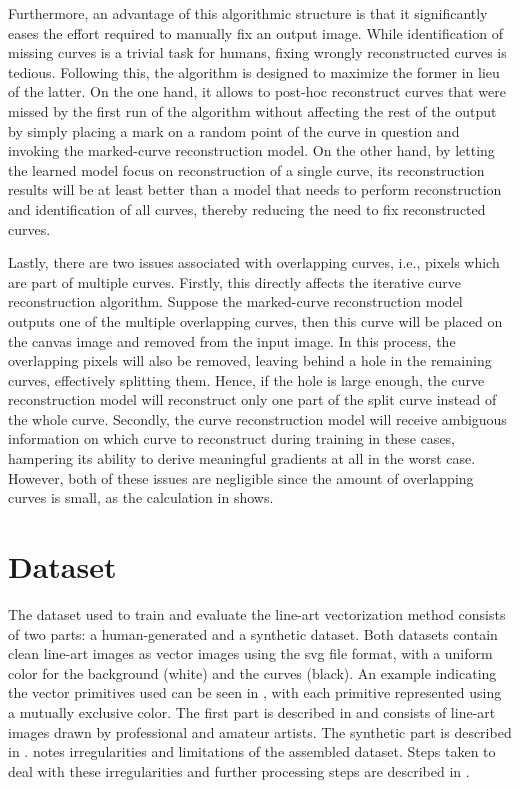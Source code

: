 Furthermore, an advantage of this algorithmic structure is that it significantly eases the effort required to manually fix an output image. While identification of missing curves is a trivial task for humans, fixing wrongly reconstructed curves is tedious. Following this, the algorithm is designed to maximize the former in lieu of the latter. On the one hand, it allows to post-hoc reconstruct curves that were missed by the first run of the algorithm without affecting the rest of the output by simply placing a mark on a random point of the curve in question and invoking the marked-curve reconstruction model. On the other hand, by letting the learned model focus on reconstruction of a single curve, its reconstruction results will be at least better than a model that needs to perform reconstruction and identification of all curves, thereby reducing the need to fix reconstructed curves.

Lastly, there are two issues associated with overlapping curves, i.e., pixels which are part of multiple curves. Firstly, this directly affects the iterative curve reconstruction algorithm. Suppose the marked-curve reconstruction model outputs one of the multiple overlapping curves, then this curve will be placed on the canvas image and removed from the input image. In this process, the overlapping pixels will also be removed, leaving behind a hole in the remaining curves, effectively splitting them. Hence, if the hole is large enough, the curve reconstruction model will reconstruct only one part of the split curve instead of the whole curve. Secondly, the curve reconstruction model will receive ambiguous information on which curve to reconstruct during training in these cases, hampering its ability to derive meaningful gradients at all in the worst case. However, both of these issues are negligible since the amount of overlapping curves is small, as the calculation in  shows.


\section{Dataset}
\label{sec:dataset}

The dataset used to train and evaluate the line-art vectorization method consists of two parts: a human-generated and a synthetic dataset. Both datasets contain clean line-art images as vector images using the \gls{svg} file format, with a uniform color for the background (white) and the curves (black). An example indicating the vector primitives used can be seen in , with each primitive represented using a mutually exclusive color. The first part is described in  and consists of line-art images drawn by professional and amateur artists. The synthetic part is described in .  notes irregularities and limitations of the assembled dataset. Steps taken to deal with these irregularities and further processing steps are described in .

